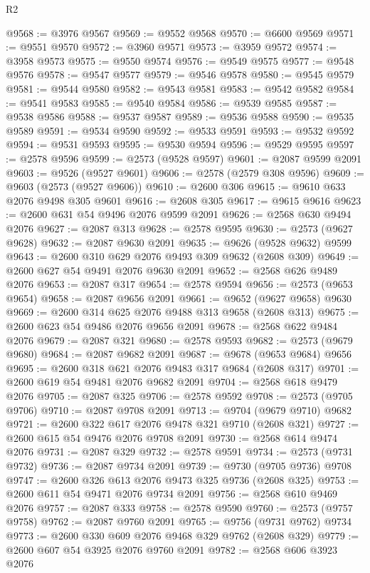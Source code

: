 \begin{lexlean}{R2}
\begin{coremodule}
@9568 := @3976 @9567
@9569 := @9552 @9568
@9570 := @6600 @9569
@9571 := @9551 @9570
@9572 := @3960 @9571
@9573 := @3959 @9572
@9574 := @3958 @9573
@9575 := @9550 @9574
@9576 := @9549 @9575
@9577 := @9548 @9576
@9578 := @9547 @9577
@9579 := @9546 @9578
@9580 := @9545 @9579
@9581 := @9544 @9580
@9582 := @9543 @9581
@9583 := @9542 @9582
@9584 := @9541 @9583
@9585 := @9540 @9584
@9586 := @9539 @9585
@9587 := @9538 @9586
@9588 := @9537 @9587
@9589 := @9536 @9588
@9590 := @9535 @9589
@9591 := @9534 @9590
@9592 := @9533 @9591
@9593 := @9532 @9592
@9594 := @9531 @9593
@9595 := @9530 @9594
@9596 := @9529 @9595
@9597 := @2578 @9596
@9599 := @2573 (@9528 @9597)
@9601 := @2087 @9599 @2091
@9603 := @9526 (@9527 @9601)
@9606 := @2578 (@2579 @308 @9596)
@9609 := @9603 (@2573 (@9527 @9606))
@9610 := @2600 @306
@9615 := @9610 @633 @2076 @9498 @305 @9601
@9616 := @2608 @305
@9617 := @9615 @9616
@9623 := @2600 @631 @54 @9496 @2076 @9599 @2091
@9626 := @2568 @630 @9494 @2076
@9627 := @2087 @313
@9628 := @2578 @9595
@9630 := @2573 (@9627 @9628)
@9632 := @2087 @9630 @2091
@9635 := @9626 (@9528 @9632) @9599
@9643 := @2600 @310 @629 @2076 @9493 @309 @9632 (@2608 @309)
@9649 := @2600 @627 @54 @9491 @2076 @9630 @2091
@9652 := @2568 @626 @9489 @2076
@9653 := @2087 @317
@9654 := @2578 @9594
@9656 := @2573 (@9653 @9654)
@9658 := @2087 @9656 @2091
@9661 := @9652 (@9627 @9658) @9630
@9669 := @2600 @314 @625 @2076 @9488 @313 @9658 (@2608 @313)
@9675 := @2600 @623 @54 @9486 @2076 @9656 @2091
@9678 := @2568 @622 @9484 @2076
@9679 := @2087 @321
@9680 := @2578 @9593
@9682 := @2573 (@9679 @9680)
@9684 := @2087 @9682 @2091
@9687 := @9678 (@9653 @9684) @9656
@9695 := @2600 @318 @621 @2076 @9483 @317 @9684 (@2608 @317)
@9701 := @2600 @619 @54 @9481 @2076 @9682 @2091
@9704 := @2568 @618 @9479 @2076
@9705 := @2087 @325
@9706 := @2578 @9592
@9708 := @2573 (@9705 @9706)
@9710 := @2087 @9708 @2091
@9713 := @9704 (@9679 @9710) @9682
@9721 := @2600 @322 @617 @2076 @9478 @321 @9710 (@2608 @321)
@9727 := @2600 @615 @54 @9476 @2076 @9708 @2091
@9730 := @2568 @614 @9474 @2076
@9731 := @2087 @329
@9732 := @2578 @9591
@9734 := @2573 (@9731 @9732)
@9736 := @2087 @9734 @2091
@9739 := @9730 (@9705 @9736) @9708
@9747 := @2600 @326 @613 @2076 @9473 @325 @9736 (@2608 @325)
@9753 := @2600 @611 @54 @9471 @2076 @9734 @2091
@9756 := @2568 @610 @9469 @2076
@9757 := @2087 @333
@9758 := @2578 @9590
@9760 := @2573 (@9757 @9758)
@9762 := @2087 @9760 @2091
@9765 := @9756 (@9731 @9762) @9734
@9773 := @2600 @330 @609 @2076 @9468 @329 @9762 (@2608 @329)
@9779 := @2600 @607 @54 @3925 @2076 @9760 @2091
@9782 := @2568 @606 @3923 @2076

\end{coremodule}
\end{lexlean}
